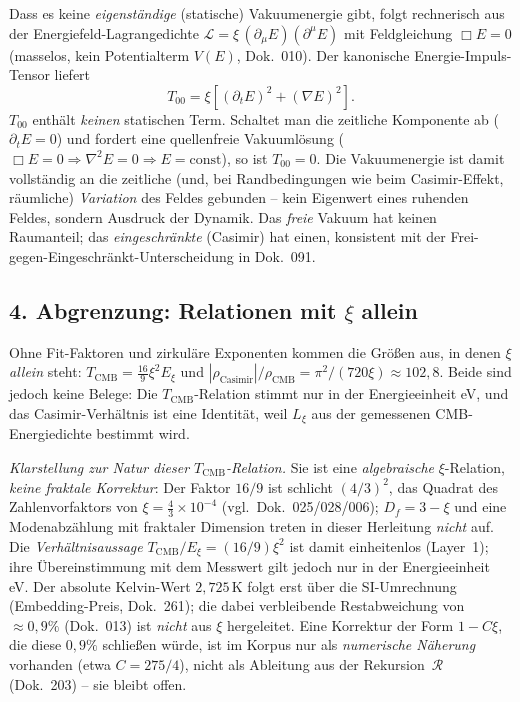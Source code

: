 Dass es keine \emph{eigenständige} (statische) Vakuumenergie gibt, folgt
rechnerisch aus der Energiefeld-Lagrangedichte $\mathcal{L}=\xi\,(\partial_\mu
E)(\partial^\mu E)$ mit Feldgleichung $\Box E=0$ (masselos, kein Potentialterm
$V(E)$, Dok.~010). Der kanonische Energie-Impuls-Tensor liefert
\[
  T_{00} = \xi\left[(\partial_t E)^2 + (\nabla E)^2\right].
\]
$T_{00}$ enthält \emph{keinen} statischen Term. Schaltet man die zeitliche
Komponente ab ($\partial_t E=0$) und fordert eine quellenfreie Vakuumlösung
($\Box E=0\Rightarrow\nabla^2 E=0\Rightarrow E=\text{const}$), so ist
$T_{00}=0$. Die Vakuumenergie ist damit vollständig an die zeitliche (und,
bei Randbedingungen wie beim Casimir-Effekt, räumliche) \emph{Variation} des
Feldes gebunden -- kein Eigenwert eines ruhenden Feldes, sondern Ausdruck
der Dynamik. Das \emph{freie} Vakuum hat keinen Raumanteil; das
\emph{eingeschränkte} (Casimir) hat einen, konsistent mit der
Frei-gegen-Eingeschränkt-Unterscheidung in Dok.~091.

\subsection*{4. Abgrenzung: Relationen mit $\xi$ allein}

Ohne Fit-Faktoren und zirkuläre Exponenten kommen die Größen aus, in denen $\xi$ \emph{allein} steht: $T_{\text{CMB}}=\tfrac{16}{9}\xi^2
E_\xi$ und $|\rho_{\text{Casimir}}|/\rho_{\text{CMB}}=\pi^2/(720\xi)\approx102{,}8$. Beide sind jedoch keine Belege: Die $T_{\text{CMB}}$-Relation stimmt nur in der Energieeinheit eV, und das Casimir-Verhältnis ist eine Identität, weil $L_\xi$ aus der gemessenen CMB-Energiedichte bestimmt wird.

\emph{Klarstellung zur Natur dieser $T_{\text{CMB}}$-Relation.} Sie ist eine
\emph{algebraische} $\xi$-Relation, \emph{keine fraktale Korrektur}: Der Faktor
$16/9$ ist schlicht $(4/3)^2$, das Quadrat des Zahlenvorfaktors von
$\xi = \tfrac{4}{3}\times10^{-4}$ (vgl.\ Dok.~025/028/006); $D_f = 3-\xi$ und
eine Modenabzählung mit fraktaler Dimension treten in dieser Herleitung
\emph{nicht} auf. Die \emph{Verhältnisaussage}
$T_{\text{CMB}}/E_\xi = (16/9)\xi^2$ ist damit einheitenlos (Layer~1); ihre
Übereinstimmung mit dem Messwert gilt jedoch nur in der Energieeinheit eV. Der absolute
Kelvin-Wert $2{,}725$\,K folgt erst über die SI-Umrechnung (Embedding-Preis,
Dok.~261); die dabei verbleibende Restabweichung von $\approx 0{,}9\%$
(Dok.~013) ist \emph{nicht} aus $\xi$ hergeleitet. Eine Korrektur der Form
$1-C\xi$, die diese $0{,}9\%$ schließen würde, ist im Korpus nur als
\emph{numerische Näherung} vorhanden (etwa $C=275/4$), nicht als Ableitung aus
der Rekursion~$\mathcal{R}$ (Dok.~203) -- sie bleibt offen.

